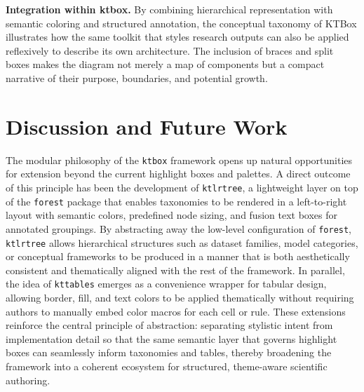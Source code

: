 \documentclass[12pt,onecolumn]{article}
\begin{document}
  \noindent\textbf{Integration within ktbox.} By combining hierarchical representation with semantic coloring and structured annotation, the conceptual taxonomy of KTBox illustrates how the same toolkit that styles research outputs can also be applied reflexively to describe its own architecture. The inclusion of braces and split boxes makes the diagram not merely a map of components but a compact narrative of their purpose, boundaries, and potential growth.

  
  \section{Discussion and Future Work}
  \label{sec:discussion-and-future-work}
The modular philosophy of the \texttt{ktbox} framework opens up natural opportunities for extension beyond the current highlight boxes and palettes. A direct outcome of this principle has been the development of \texttt{ktlrtree}, a lightweight layer on top of the \texttt{forest} package that enables taxonomies to be rendered in a left-to-right layout with semantic colors, predefined node sizing, and fusion text boxes for annotated groupings. By abstracting away the low-level configuration of \texttt{forest}, \texttt{ktlrtree} allows hierarchical structures such as dataset families, model categories, or conceptual frameworks to be produced in a manner that is both aesthetically consistent and thematically aligned with the rest of the framework. In parallel, the idea of \texttt{kttables} emerges as a convenience wrapper for tabular design, allowing border, fill, and text colors to be applied thematically without requiring authors to manually embed color macros for each cell or rule. These extensions reinforce the central principle of abstraction: separating stylistic intent from implementation detail so that the same semantic layer that governs highlight boxes can seamlessly inform taxonomies and tables, thereby broadening the framework into a coherent ecosystem for structured, theme-aware scientific authoring.


\end{document}

